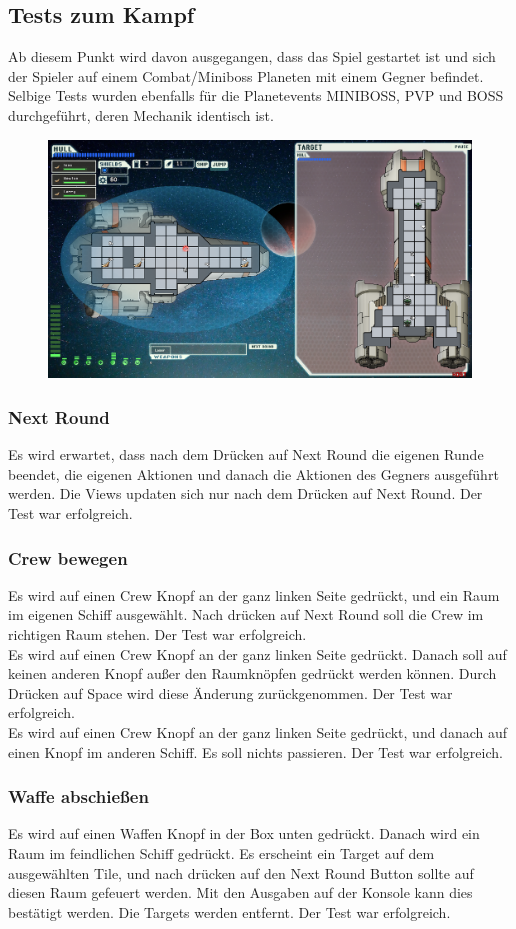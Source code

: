 \documentclass[fontsize=12pt,paper=a4,twoside]{scrartcl}
\begin{document}
\subsection{Tests zum Kampf}
Ab diesem Punkt wird davon ausgegangen, dass das Spiel gestartet ist und sich der Spieler auf einem Combat/Miniboss Planeten mit einem Gegner befindet. Selbige Tests wurden ebenfalls für die Planetevents MINIBOSS, PVP und BOSS durchgeführt, deren Mechanik identisch ist. \\
\begin{figure}[h!]
\centering
\includegraphics[width=0.5\linewidth]{images/battle.png}
\end{figure}
\subsubsection{Next Round} 
Es wird erwartet, dass nach dem Drücken auf Next Round die eigenen Runde beendet, die eigenen Aktionen und danach die Aktionen des Gegners ausgeführt werden. Die Views updaten sich nur nach dem Drücken auf Next Round.  Der Test war erfolgreich. \\
\subsubsection{Crew bewegen}
Es wird auf einen Crew Knopf an der ganz linken Seite gedrückt, und ein Raum im eigenen Schiff ausgewählt. Nach drücken auf Next Round soll die Crew im richtigen Raum stehen. Der Test war erfolgreich. \\
Es wird auf einen Crew Knopf an der ganz linken Seite gedrückt. Danach soll auf keinen anderen Knopf außer den Raumknöpfen gedrückt werden können. Durch Drücken auf Space wird diese Änderung zurückgenommen.  Der Test war erfolgreich. \\
Es wird auf einen Crew Knopf an der ganz linken Seite gedrückt, und danach auf einen Knopf im anderen Schiff. Es soll nichts passieren. Der Test war erfolgreich. \\
\subsubsection{Waffe abschießen}
Es wird auf einen Waffen Knopf in der Box unten gedrückt. Danach wird ein Raum im feindlichen Schiff gedrückt. Es erscheint ein Target auf dem ausgewählten Tile, und nach drücken auf den Next Round Button sollte auf diesen Raum gefeuert werden. Mit den Ausgaben auf der Konsole kann dies bestätigt werden. Die Targets werden entfernt.  Der Test war erfolgreich. \\
\end{document}

